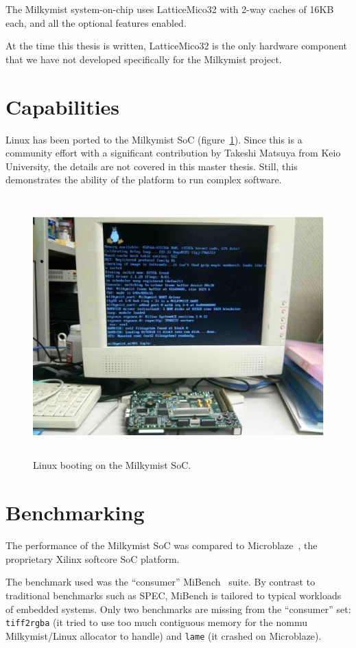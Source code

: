 \documentclass[a4paper,11pt]{kthesis}
\begin{document}
The Milkymist system-on-chip uses LatticeMico32 with 2-way caches of 16KB each, and all the optional features enabled.

At the time this thesis is written, LatticeMico32 is the only hardware component that we have not developed specifically for the Milkymist project.

\section{Capabilities}
Linux has been ported to the Milkymist SoC (figure~\ref{fig:linux}). Since this is a community effort with a significant contribution by Takeshi Matsuya from Keio University, the details are not covered in this master thesis. Still, this demonstrates the ability of the platform to run complex software.

\begin{figure}[htp]
\centering
\includegraphics[height=100mm]{linux.eps}
\caption{Linux booting on the Milkymist SoC.}
\label{fig:linux}
\end{figure}

\section{Benchmarking}
The performance of the Milkymist SoC was compared to Microblaze~\cite{microblaze}, the proprietary Xilinx softcore SoC platform.

The benchmark used was the ``consumer'' MiBench~\cite{mibench} suite. By contrast to traditional benchmarks such as SPEC, MiBench is tailored to typical workloads of embedded systems. Only two benchmarks are missing from the ``consumer'' set: \verb!tiff2rgba! (it tried to use too much contiguous memory for the nommu Milkymist/Linux allocator to handle) and \verb!lame! (it crashed on Microblaze).
\end{document}

